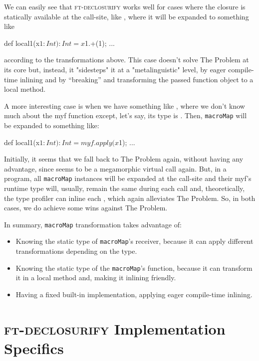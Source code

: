 We can easily see that \textsc{ft-declosurify} works well for cases where the closure
is statically available at the call-site, like ,
where it will be expanded to something like

\begin{scalaCode}
{
  def local1(x$1: Int): Int = x$1.+(1);
  ...
}
\end{scalaCode}
according to the transformations above. This case doesn't solve The Problem
at its core but, instead, it "sidesteps" it at a "metalinguistic" level, by
eager compile-time inlining and by ``breaking'' and transforming the passed function
object to a local method.

A more interesting case is when we have something like , where we don't know much about the myf function except, let's
say, its type is . Then, \texttt{macroMap} will be expanded to something
like:

\begin{scalaCode}
{
 def local1(x$1: Int): Int = myf.apply(x$1);
  ...
}
\end{scalaCode}

Initially, it seems that we fall back to The Problem again, without having any
advantage, since  seems to be a megamorphic virtual call again.
But, in a program, all \texttt{macroMap} instances will be expanded at the call-site and their myf's
runtime type will, usually, remain the same during each call and, theoretically,
the type profiler can inline each , which again alleviates 
The Problem. So, in both cases, we do achieve some wins against The Problem.

In summary, \texttt{macroMap} transformation takes advantage of:
\begin{itemize}
 \item Knowing the static type of \texttt{macroMap}'s receiver, because it can apply different transformations depending on the type.
  \item Knowing the static type of the \texttt{macroMap}'s function, because it can transform it in a local method and, making it inlining friendly.
  \item Having a fixed built-in implementation, applying eager compile-time inlining.
\end{itemize}


\section{\textsc{ft-declosurify} Implementation Specifics}
\label{ft_declosurify_impl}

